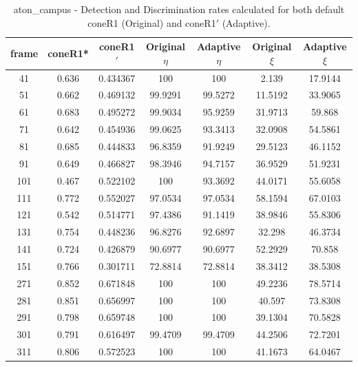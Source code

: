 \begin{appendices}
\begin{table}
\centering
\caption{aton\_campus - Detection and Discrimination rates calculated for both default coneR1 (Original) and coneR1$'$ (Adaptive).}
\begin{tabular}{ |c|c|c|c|c|c|c| }
\hline
\textbf{frame} &  \textbf{coneR1*} &  \textbf{coneR1$'$} &  \textbf{Original $\eta$} &  \textbf{Adaptive $\eta$} &  \textbf{Original $\xi$} &  \textbf{Adaptive $\xi$} \\
\hline
\hline
41 &  0.636 &  0.434367 &  100 &  100 &  2.139 &  17.9144 \\
\hline
51 &  0.662 &  0.469132 &  99.9291 &  99.5272 &  11.5192 &  33.9065 \\
\hline
61 &  0.683 &  0.495272 &  99.9034 &  95.9259 &  31.9713 &  59.868 \\
\hline
71 &  0.642 &  0.454936 &  99.0625 &  93.3413 &  32.0908 &  54.5861 \\
\hline
81 &  0.685 &  0.444833 &  96.8359 &  91.9249 &  29.5123 &  46.1152 \\
\hline
91 &  0.649 &  0.466827 &  98.3946 &  94.7157 &  36.9529 &  51.9231 \\
\hline
101 &  0.467 &  0.522102 &  100 &  93.3692 &  44.0171 &  55.6058 \\
\hline
111 &  0.772 &  0.552027 &  97.0534 &  97.0534 &  58.1594 &  67.0103 \\
\hline
121 &  0.542 &  0.514771 &  97.4386 &  91.1419 &  38.9846 &  55.8306 \\
\hline
131 &  0.754 &  0.448236 &  96.8276 &  92.6897 &  32.298 &  46.3734 \\
\hline
141 &  0.724 &  0.426879 &  90.6977 &  90.6977 &  52.2929 &  70.858 \\
\hline
151 &  0.766 &  0.301711 &  72.8814 &  72.8814 &  38.3412 &  38.5308 \\
\hline
271 &  0.852 &  0.671848 &  100 &  100 &  49.2236 &  78.5714 \\
\hline
281 &  0.851 &  0.656997 &  100 &  100 &  40.597 &  73.8308 \\
\hline
291 &  0.798 &  0.659748 &  100 &  100 &  39.1304 &  70.5828 \\
\hline
301 &  0.791 &  0.616497 &  99.4709 &  99.4709 &  44.2506 &  72.7201 \\
\hline
311 &  0.806 &  0.572523 &  100 &  100 &  41.1673 &  64.0467 \\

\end{tabular}
\end{table}
\end{appendices}
